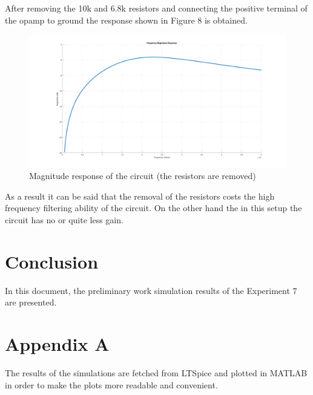 \documentclass[letterpaper,12pt]{article}
\begin{document}
After removing the 10k and 6.8k resistors and connecting the positive terminal of the opamp to ground the response shown in Figure 8 is obtained.

\begin{figure}[H]
    \centering
    \includegraphics[width=1\textwidth]{2_1_2.png}
    \caption{Magnitude response of the circuit (the resistors are removed)}
\end{figure} 
As a result it can be said that the removal of the resistors costs the high frequency filtering ability of the circuit. On the other hand the in this setup the circuit has no or quite less gain. 

\section{Conclusion}
In this document, the preliminary work simulation results of the Experiment 7 are presented.
\section*{Appendix A}
The results of the simulations are fetched from LTSpice and plotted in MATLAB in order to make the plots more readable and convenient.
\end{document}
